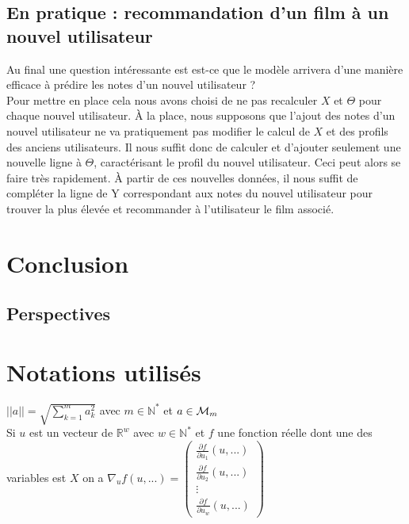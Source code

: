 \documentclass[a4paper,10pt]{article}
\begin{document}
\subsection{En pratique : recommandation d'un film à un nouvel utilisateur}

Au final une question intéressante est est-ce que le modèle arrivera d'une manière efficace à prédire les notes d'un nouvel utilisateur ?\\

Pour mettre en place cela nous avons choisi de ne pas recalculer $X$ et $\Theta$ pour chaque nouvel utilisateur. À la place, nous supposons que l'ajout des notes d'un nouvel utilisateur ne va pratiquement pas modifier le calcul de $X$ et des profils des anciens utilisateurs. Il nous suffit donc de calculer et d'ajouter seulement une nouvelle ligne à $\Theta$, caractérisant le profil du nouvel utilisateur. Ceci peut alors se faire très rapidement. À partir de ces nouvelles données, il nous suffit de compléter la ligne de Y correspondant aux notes du nouvel utilisateur pour trouver la plus élevée et recommander à l'utilisateur le film associé.

\section*{Conclusion}

\subsection*{Perspectives}
\appendix
\section{Notations utilisés}

$||a|| = \sqrt{\sum_{k = 1}^{m} a_{k}^{2}}$ avec $m \in \mathbb{N}^*$ et $a \in {\cal M}_{m}$\\

Si $u$ est un vecteur de $\mathbb{R}^w$ avec $w \in \mathbb{N}^*$ et $f$ une fonction réelle dont une des variables est $X$ on a 
$\nabla_{u} f(u, ...) =
\begin{pmatrix}
\frac{\partial f}{\partial u_{1}}(u, ...)\\
\frac{\partial f}{\partial u_{2}}(u, ...)\\
\vdots\\
\frac{\partial f}{\partial u_{w}}(u, ...)
\end{pmatrix}$ 
\end{document}
